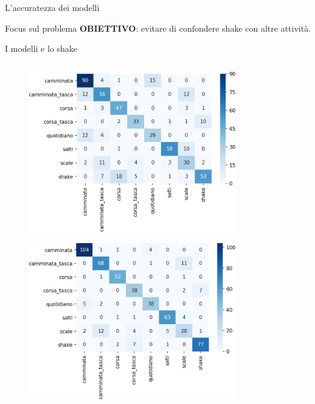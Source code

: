 \documentclass{beamer}
\begin{document}
\begin{frame}{L'accuratezza dei modelli}

\end{frame}

\begin{frame}{Focus sul problema}
\textbf{OBIETTIVO}: evitare di confondere shake con altre attività.

\end{frame}

\begin{frame}{I modelli e lo shake}
\begin{columns}[T] %
\begin{column}{.5\textwidth}
\begin{figure}[H]
\includegraphics[width=0.8\textwidth]{../figure/confusionMatrix-LDA.png}
\end{figure}
\begin{figure}[H]
\includegraphics[width=0.8\textwidth]{../figure/confusionMatrix-Mn.png}
\end{figure}

\end{column}
\end{columns}
\end{frame}
\end{document}
